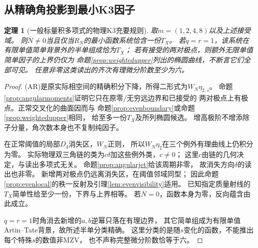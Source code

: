 \documentclass[11pt,a4paper]{ctexart}
\theoremstyle{cnplain}\newtheorem{theorem}{定理}[section]
\theoremstyle{definition}\newtheorem{definition}[theorem]{定义}
\theoremstyle{remark}\newtheorem{remark}[theorem]{注}
\begin{document}
\subsection{从精确角投影到最小K3因子}
\begin{theorem}[一般标量积多项式的物理K3充要规则]\label{thm:angulark3}
取$m=(1,2,4,8)$以及上述接受域。
则$\overline N\ne0$当且仅当$R_N$的最小函数系统恰含一份$T_X$。
若$q=r=1$，该系统在有限单值简单背景外的半单组成恰为$T_X$；
若有接受的两对极点，则额外无限单值简单因子的上界仍仅为
命题\ref{prop:weightedupper}列出的椭圆曲线，不断言它们全部可见。
任意非零这类读出的齐次有理微分阶数至少为六。
\end{theorem}
\begin{proof}
(AR)是原实际相空间的精确积分下降，所得二形式为$W_N\eta_{2,s}$。
命题\ref{prop:angularmoments}证明它只在原零/无穷远边界和已接受的
两对极点上有极点。正常交叉化的曲面因而与
命题\ref{prop:evenboundary}或命题\ref{prop:weightedupper}相同，
给至多一份$T_X$及所列椭圆候选。
增高极阶不增添除子分量，角次数本身也不复制纯因子。

在正常阈值的局部$D_4$消失区，$W_N$正则，
所以$W_N\eta_2$在三个例外有理曲线上仍积分为零。
实际物理双三角链的类为$c\delta$加这些例外类，$c\ne0$；
这里$c$由链的几何决定，与读出多项式无关。
命题\ref{prop:angularjet}给该周期非零，
故消失方向$\delta$的读出也非零。
新增两对极点仍远离消失区，在阈值邻域同型；
因此命题\ref{prop:evenlocal}的秩一反射及引理\ref{lem:evenvisibility}适用。
已知指定质量射线的$T_X$简单性给至少一份，下界与上界相等。
若$\overline N=0$，函数本身为零，反向蕴含由此成立。

$q=r=1$时角消去新增的$a,b$逆幂只落在有理边界，
其它简单组成为有限单值Artin--Tate背景，故所述半单分类精确。
这里分类的是随$s$变化的函数，不能推出每个特殊$s$的数值非MZV，
也不声称完整微分阶数恰等于六。
\end{proof}
\end{document}
